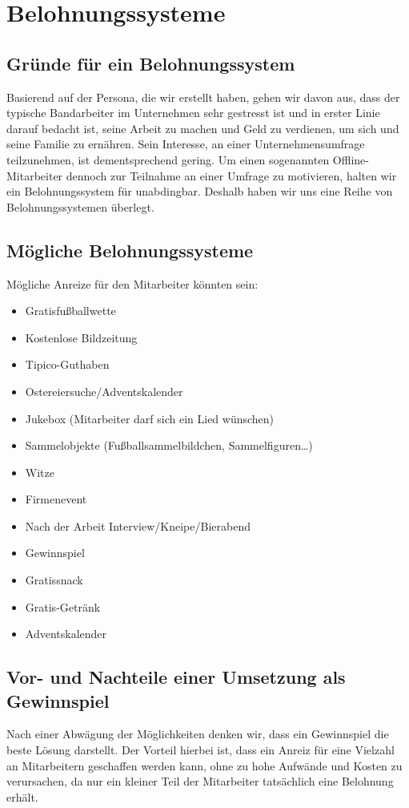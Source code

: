 \section{Belohnungssysteme}

\subsection{Gründe für ein Belohnungssystem}
Basierend auf der Persona, die wir erstellt haben, gehen wir davon aus, dass der typische Bandarbeiter im Unternehmen sehr gestresst ist und in erster Linie darauf bedacht ist, seine Arbeit zu machen und Geld zu verdienen, um sich und seine Familie zu ernähren. Sein Interesse, an einer Unternehmensumfrage teilzunehmen, ist dementsprechend gering. Um einen sogenannten Offline-Mitarbeiter dennoch zur Teilnahme an einer Umfrage zu motivieren, halten wir ein Belohnungssystem für unabdingbar. Deshalb haben wir uns eine Reihe von Belohnungssystemen überlegt.

\subsection{Mögliche Belohnungssysteme}
Mögliche Anreize für den Mitarbeiter könnten sein:
\begin{itemize} 
\item Gratisfußballwette
\item Kostenlose Bildzeitung
\item Tipico-Guthaben
\item Ostereiersuche/Adventskalender
\item Jukebox (Mitarbeiter darf sich ein Lied wünschen)
\item Sammelobjekte (Fußballsammelbildchen, Sammelfiguren…)
\item Witze 
\item Firmenevent
\item Nach der Arbeit Interview/Kneipe/Bierabend
\item Gewinnspiel
\item Gratissnack
\item Gratis-Getränk
\item Adventskalender
\end{itemize}

\subsection{Vor- und Nachteile einer Umsetzung als Gewinnspiel}
Nach einer Abwägung der Möglichkeiten denken wir, dass ein Gewinnspiel die beste Lösung darstellt. Der Vorteil hierbei ist, dass ein Anreiz für eine Vielzahl an Mitarbeitern geschaffen werden kann, ohne zu hohe Aufwände und Kosten zu verursachen, da nur ein kleiner Teil der Mitarbeiter tatsächlich eine Belohnung erhält. 

